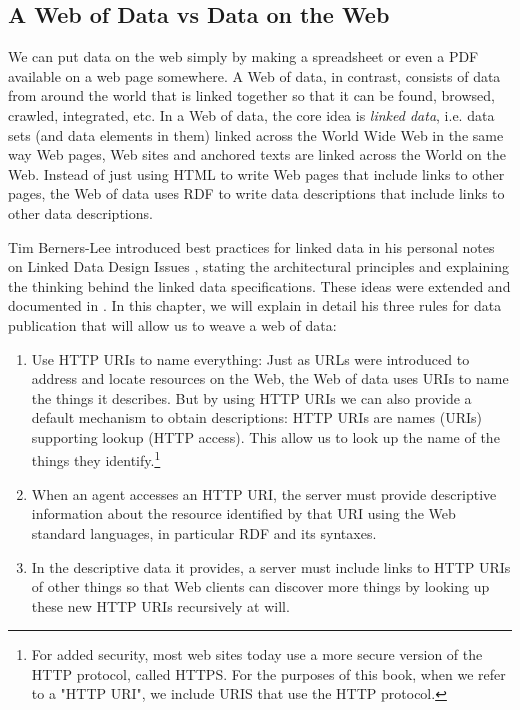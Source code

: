 \subsection{A Web of Data vs Data on the Web}

We can put data on the web simply by making a spreadsheet or even a PDF available on
a web page somewhere.    A Web of data, in contrast, consists of data from around the world that is linked together so that it can be found, browsed,
crawled, integrated, etc. In a Web of data, the core idea is \emph{linked data}, i.e. data sets (and data elements in them)  linked across the
World Wide Web in the same way Web pages, Web sites and anchored texts
are linked across the World on the Web. Instead of just
using HTML to write Web pages that include links to other pages, the Web of
data uses RDF to write data descriptions that include links to other data
descriptions.

Tim Berners-Lee introduced best practices for linked data in his
personal notes on Linked Data Design Issues \cite{linkeddatadesign}, stating the
architectural principles and explaining the thinking behind the linked data
specifications.  These ideas were extended and documented in \cite{heath2011linked}.  In this chapter, we will explain in detail his three rules 
for data publication that will allow us to weave a web of data:



\begin{enumerate}
\def\labelenumi{\arabic{enumi}.}
\item
\label{ruleURI}
  Use HTTP URIs to name everything: Just as URLs were introduced to
  address and locate resources on the Web, the Web of data uses URIs to
  name the things it describes. But by using HTTP URIs we can also
  provide a default mechanism to obtain descriptions: HTTP URIs are
  names (URIs) supporting lookup (HTTP access). This allow us to
  look up the name of the things they identify.\footnote{For added security,
  most web sites today use a more secure version of the HTTP protocol, called HTTPS. 
  For the purposes of this book, when we refer to a "HTTP URI", we include URIS
  that use the HTTP protocol.}
\item
\label{ruleFYN}
  When an agent accesses an HTTP URI, the server must provide descriptive
  information about the resource identified by that URI using the Web
  standard languages, in particular RDF and its syntaxes.
\item
\label{ruleLink}
  In the descriptive data it provides, a server must include links to
  HTTP URIs of other things so that Web clients can discover more things
  by looking up these new HTTP URIs recursively at will.
\end{enumerate}

